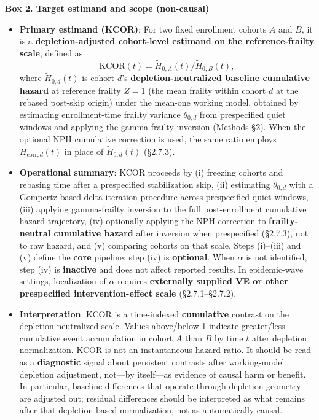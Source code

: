 \documentclass[
]{article}
\providecommand{\tightlist}{%
  \setlength{\itemsep}{0pt}\setlength{\parskip}{0pt}}
\renewenvironment{quote}{\begin{mdframed}[style=kcorquote]}{\end{mdframed}}
\begin{document}
\begin{quote}
\textbf{Box 2. Target estimand and scope (non-causal)}

\begin{itemize}
\tightlist
\item
  \textbf{Primary estimand (KCOR)}: For two fixed enrollment cohorts \(A\) and \(B\), it is a \textbf{depletion-adjusted cohort-level estimand on the reference-frailty scale}, defined as \[\mathrm{KCOR}(t)=\tilde H_{0,A}(t)/\tilde H_{0,B}(t),\] where \(\tilde H_{0,d}(t)\) is cohort \(d\)'s \textbf{depletion-neutralized baseline cumulative hazard} at reference frailty \(Z=1\) (the mean frailty within cohort \(d\) at the rebased post-skip origin) under the mean-one working model, obtained by estimating enrollment-time frailty variance \(\theta_{0,d}\) from prespecified quiet windows and applying the gamma-frailty inversion (Methods §2). When the optional NPH cumulative correction is used, the same ratio employs \(H_{\mathrm{corr},d}(t)\) in place of \(\tilde H_{0,d}(t)\) (§2.7.3).
\item
  \textbf{Operational summary}: KCOR proceeds by (i) freezing cohorts and rebasing time after a prespecified stabilization skip, (ii) estimating \(\theta_{0,d}\) with a Gompertz-based delta-iteration procedure across prespecified quiet windows, (iii) applying gamma-frailty inversion to the full post-enrollment cumulative hazard trajectory, (iv) optionally applying the NPH correction to \textbf{frailty-neutral cumulative hazard} after inversion when prespecified (§2.7.3), not to raw hazard, and (v) comparing cohorts on that scale. Steps (i)--(iii) and (v) define the \textbf{core} pipeline; step (iv) is \textbf{optional}. When \(\alpha\) is not identified, step (iv) is \textbf{inactive} and does not affect reported results. In epidemic-wave settings, localization of \(\alpha\) requires \textbf{externally supplied VE or other prespecified intervention-effect scale} (§2.7.1--§2.7.2).
\item
  \textbf{Interpretation}: KCOR is a time-indexed \textbf{cumulative} contrast on the depletion-neutralized scale. Values above/below 1 indicate greater/less cumulative event accumulation in cohort \(A\) than \(B\) by time \(t\) after depletion normalization. KCOR is not an instantaneous hazard ratio. It should be read as a \textbf{diagnostic} signal about persistent contrasts after working-model depletion adjustment, not---by itself---as evidence of causal harm or benefit. In particular, baseline differences that operate through depletion geometry are adjusted out; residual differences should be interpreted as what remains after that depletion-based normalization, not as automatically causal.

\end{itemize}
\end{quote}
\end{document}
